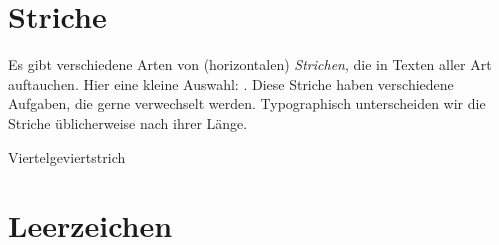 \section{Striche}

Es gibt verschiedene Arten von (horizontalen) \emph{Strichen}, die in
Texten aller Art auftauchen.  Hier eine kleine Auswahl:
\Char{-\,--\,---\,$-$\,$=$}.  Diese Striche haben verschiedene
Aufgaben, die gerne verwechselt werden.  Typographisch unterscheiden
wir die Striche üblicherweise nach ihrer Länge.

\begin{description}
\item[Viertelgeviertstrich]
\end{description}

\section{Leerzeichen}

